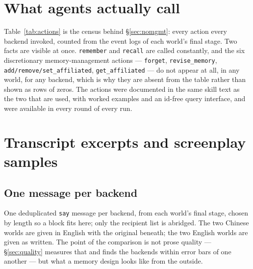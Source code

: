 \documentclass{article}
\newcommand{\code}[1]{\texttt{\small #1}}
\begin{document}
\begin{table}[h]
\centering
\caption{What the mechanism costs, per world. \emph{recall}: number of calls,
median semantic hits plus rows added by one-hop expansion, the resulting
amplification, and how often the query string appears in each group.
\emph{affiliated}: median siblings carried by a row at one owner versus four or
more. \emph{keep-shorter}: merges whose discarded side the log
preserves, over all merges; the median characters discarded; the share of those
merges whose surviving text loses a named character; and the share where the
lost name is the party that ordered the act.}
\label{tab:cost}
\resizebox{\textwidth}{!}{}
\end{table}

\section{What agents actually call}
\label{app:actions}

Table~\ref{tab:actions} is the census behind \S\ref{sec:nomgmt}: every action
every backend invoked, counted from the event logs of each world's final
stage. Two facts are visible at once. \code{remember} and \code{recall} are
called constantly, and the six discretionary memory-management actions ---
\code{forget}, \code{revise\_memory}, \code{add/remove/set\_affiliated},
\code{get\_affiliated} --- do not appear at all, in any world, for any
backend, which is why they are absent from the table rather than shown as rows
of zeros. The actions were documented in the same skill text as the two that
are used, with worked examples and an id-free query interface, and were
available in every round of every run.

\begin{table}[h]
\centering
\caption{Actions called per backend, by world, over each world's final stage.
Counted from the event logs. Discretionary memory-management actions are
omitted because every count is zero.}
\label{tab:actions}
\resizebox{0.75\textwidth}{!}{}
\end{table}

\section{Transcript excerpts and screenplay samples}
\label{app:excerpts}

\subsection{One message per backend}
One deduplicated \code{say} message per backend, from each world's final
stage, chosen by length so a block fits here; only the recipient list is
abridged. The two Chinese worlds are given in English with the original
beneath; the two English worlds are given as written. The point of the
comparison is not prose quality --- \S\ref{sec:quality} measures that and
finds the backends within error bars of one another --- but what a memory
design looks like from the outside.
\end{document}
